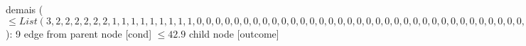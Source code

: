 {{{%
demais ($\leq List(3, 2, 2, 2, 2, 2, 2, 1, 1, 1, 1, 1, 1, 1, 1, 1, 0, 0, 0, 0, 0, 0, 0, 0, 0, 0, 0, 0, 0, 0, 0, 0, 0, 0, 0, 0, 0, 0, 0, 0, 0, 0, 0, 0, 0, 0, 0, 0, 0, 0, 0, 0, 0, 0, 0, 0, 0, 0, 0, 0, 0, 0, 0, 0, 0, 0, 0, 0, 0, 0, 0, 0, 0, 0, 0)$): 9} edge from parent node [cond] {$\leq42.9$}}
child {node [outcome] {
}}}
